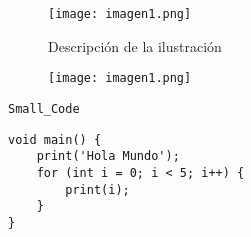 
\begin{figure}[h!]
    \centering
    \texttt{[image: imagen1.png]}
    \caption{Descripción de la ilustración}
    \label{fig:ulustracion1}
\end{figure}


\begin{figure}[h!]
    \centering
    \texttt{[image: imagen1.png]}
\end{figure}


\parencite{Name_Of_The_Author}


\lstinline{Small_Code}


\begin{center}
\begin{lstlisting}
void main() {
    print('Hola Mundo');
    for (int i = 0; i < 5; i++) {
        print(i);
    }
}
\end{lstlisting}
\end{center}

